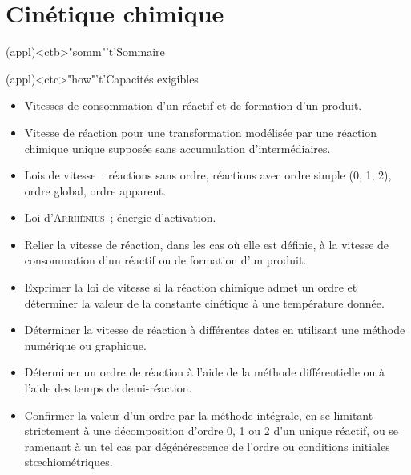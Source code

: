 \documentclass[../../main/main.tex]{subfiles}
\begin{document}
\setcounter{chapter}{2}



\chapter{Cin\'etique chimique}

\vspace*{\fill}

\begin{tcn}(appl)<ctb>"somm"'t'{Sommaire}
	\let\item\olditem
	\vspace{-15pt}
	\minitoc
	\vspace{-15pt}
\end{tcn}

\vspace*{\fill}
\newpage
\vspace*{\fill}

\begin{tcn}[sidebyside](appl)<ctc>"how"'t'{Capacités exigibles}
	\begin{itemize}[label=\rcheck]
		\item Vitesses de consommation d'un réactif et de formation d'un produit.
		\item Vitesse de réaction pour une transformation modélisée par une
		      réaction chimique unique supposée sans accumulation
		      d’intermédiaires.
		\item Lois de vitesse~: réactions sans ordre, réactions avec ordre simple
		      (0, 1, 2), ordre global, ordre apparent.
		\item Loi d'\textsc{Arrhénius}~; énergie d'activation.
		\item Relier la vitesse de réaction, dans les cas où elle est définie, à
		      la vitesse de consommation d’un réactif ou de formation d’un
		      produit.
	\end{itemize}
	\tcblower
	\begin{itemize}[label=\rcheck]
		\item Exprimer la loi de vitesse si la réaction chimique admet un ordre et
		      déterminer la valeur de la constante cinétique à une température
		      donnée.
		\item Déterminer la vitesse de réaction à différentes dates en utilisant
		      une méthode numérique ou graphique.
		\item Déterminer un ordre de réaction à l’aide de la méthode
		      différentielle ou à l’aide des temps de demi-réaction.
		\item Confirmer la valeur d'un ordre par la méthode intégrale, en se
		      limitant strictement à une décomposition d'ordre 0, 1 ou 2 d'un
		      unique réactif, ou se ramenant à un tel cas par dégénérescence de
		      l'ordre ou conditions initiales stœchiométriques.
	\end{itemize}
\end{tcn}
\vspace{-23pt}
\end{document}
